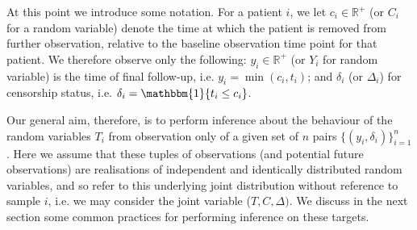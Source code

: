 \documentclass[../thesis.tex]{subfiles}
\begin{document}
At this point we introduce some notation. For a patient $i$, we let $c_i \in \mathbb{R}^{+}$ (or $C_i$ for a random variable) denote the time at which the patient is removed from further observation, relative to the baseline observation time point for that patient. We therefore observe only the following: $y_i \in \mathbb{R}^{+}$ (or $Y_i$ for random variable) is the time of final follow-up, i.e. $y_i = \min(c_i, t_i)$; and $\delta_i$ (or $\Delta_i$) for censorship status, i.e. $\delta_i = \mathbbm{1}\{t_i \leq c_i\}$. 

Our general aim, therefore, is to perform inference about the behaviour of the random variables $T_i$ from observation only of a given set of $n$ pairs $\{(y_i, \delta_i)\}_{i=1}^{n}$. Here we assume that these tuples of observations (and potential future observations) are realisations of independent and identically distributed random variables, and so refer to this underlying joint distribution without reference to sample $i$, i.e. we may consider the joint variable ($T, C, \Delta)$.  We discuss in the next section some common practices for performing inference on these targets.

   
\end{document}
